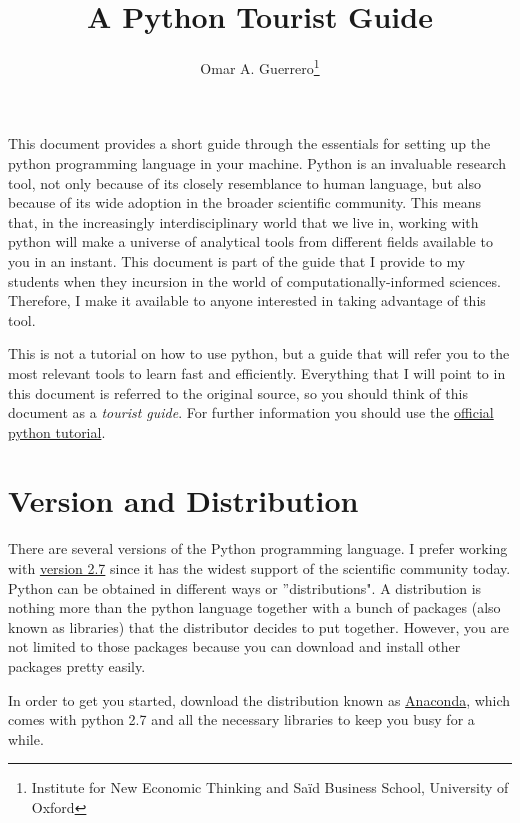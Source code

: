 \documentclass[11pt]{article}
\begin{document}
\title{A Python Tourist Guide}
\author{Omar A. Guerrero\thanks{Institute for New Economic Thinking and Saïd Business School, University of Oxford}}
\date{}
\maketitle


This document provides a short guide through the essentials for setting up the python programming language in your machine. Python is an invaluable research tool, not only because of its closely resemblance to human language, but also because of its wide adoption in the broader scientific community. This means that, in the increasingly interdisciplinary world that we live in, working with python will make a universe of analytical tools from different fields available to you in an instant. This document is part of the guide that I provide to my students when they incursion in the world of computationally-informed sciences. Therefore, I make it available to anyone interested in taking advantage of this tool. 

This is not a tutorial on how to use python, but a guide that will refer you to the most relevant tools to learn fast and efficiently. Everything that I will point to in this document is referred to the original source, so you should think of this document as a \emph{tourist guide}. For further information you should use the \href{https://docs.python.org/2/tutorial/}{official python tutorial}.


\section{Version and Distribution}

There are several versions of the Python programming language. I prefer working with \href{https://www.python.org/download/releases/2.7/}{version 2.7} since it has the widest support of the scientific community today. Python can be obtained in different ways or ''distributions". A distribution is nothing more than the python language together with a bunch of packages (also known as libraries) that the distributor decides to put together. However, you are not limited to those packages because you can download and install other packages pretty easily.

In order to get you started, download the distribution known as \href{https://store.continuum.io/cshop/anaconda/}{Anaconda}, which comes with python 2.7 and all the necessary libraries to keep you busy for a while.
\end{document}
